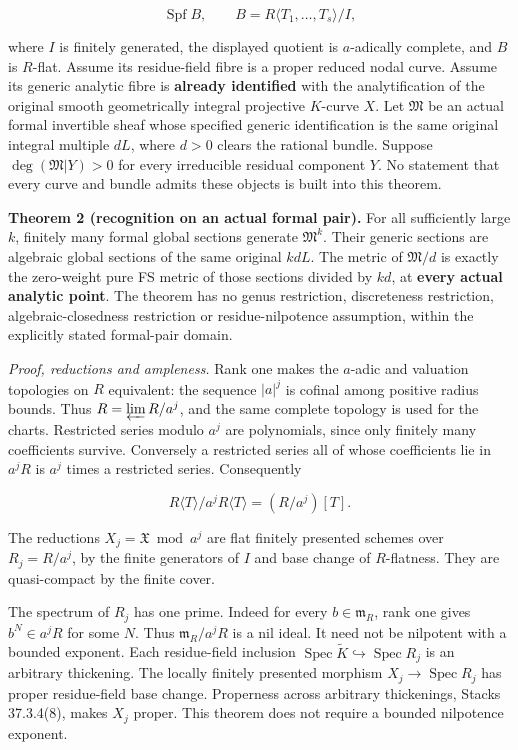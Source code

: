 \documentclass[
  11pt,
]{article}
\begin{document}
\[
 \operatorname{Spf} B,\qquad B=R\langle T_1,\ldots,T_s\rangle/I,
\]

where \(I\) is finitely generated, the displayed quotient is
\(a\)-adically complete, and \(B\) is \(R\)-flat. Assume its
residue-field fibre is a proper reduced nodal curve. Assume its generic
analytic fibre is \textbf{already identified} with the analytification
of the original smooth geometrically integral projective \(K\)-curve
\(X\). Let \(\mathfrak M\) be an actual formal invertible sheaf whose
specified generic identification is the same original integral multiple
\(dL\), where \(d>0\) clears the rational bundle. Suppose
\(\deg(\mathfrak M|Y)>0\) for every irreducible residual component
\(Y\). No statement that every curve and bundle admits these objects is
built into this theorem.

\textbf{Theorem 2 (recognition on an actual formal pair).} For all
sufficiently large \(k\), finitely many formal global sections generate
\(\mathfrak M^k\). Their generic sections are algebraic global sections
of the same original \(kdL\). The metric of \(\mathfrak M/d\) is exactly
the zero-weight pure FS metric of those sections divided by \(kd\), at
\textbf{every actual analytic point}. The theorem has no genus
restriction, discreteness restriction, algebraic-closedness restriction
or residue-nilpotence assumption, within the explicitly stated
formal-pair domain.

\emph{Proof, reductions and ampleness.} Rank one makes the \(a\)-adic
and valuation topologies on \(R\) equivalent: the sequence \(|a|^j\) is
cofinal among positive radius bounds. Thus \(R=\varprojlim R/a^j\), and
the same complete topology is used for the charts. Restricted series
modulo \(a^j\) are polynomials, since only finitely many coefficients
survive. Conversely a restricted series all of whose coefficients lie in
\(a^jR\) is \(a^j\) times a restricted series. Consequently

\[
R\langle T\rangle/a^jR\langle T\rangle=(R/a^j)[T].
\]

The reductions \(X_j=\mathfrak X\bmod a^j\) are flat finitely presented
schemes over \(R_j=R/a^j\), by the finite generators of \(I\) and base
change of \(R\)-flatness. They are quasi-compact by the finite cover.

The spectrum of \(R_j\) has one prime. Indeed for every
\(b\in\mathfrak m_R\), rank one gives \(b^N\in a^jR\) for some \(N\).
Thus \(\mathfrak m_R/a^jR\) is a nil ideal. It need not be nilpotent
with a bounded exponent. Each residue-field inclusion
\(\operatorname{Spec}\widetilde K\hookrightarrow\operatorname{Spec}R_j\)
is an arbitrary thickening. The locally finitely presented morphism
\(X_j\to\operatorname{Spec}R_j\) has proper residue-field base change.
Properness across arbitrary thickenings, Stacks 37.3.4(8), makes \(X_j\)
proper. This theorem does not require a bounded nilpotence exponent.
\end{document}
